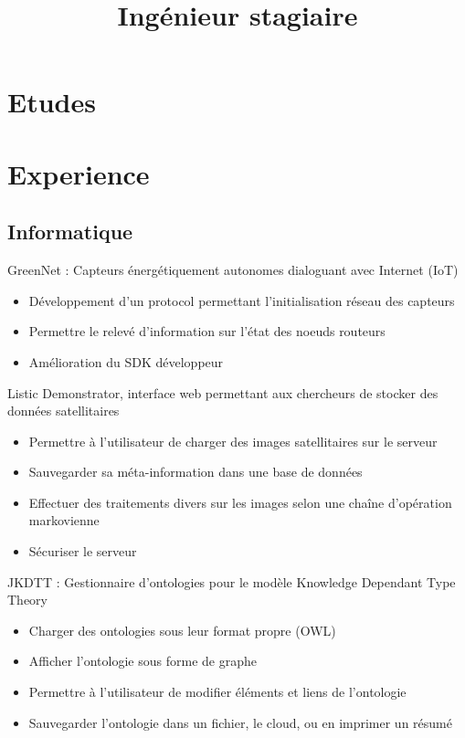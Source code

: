 \documentclass[10pt,a4paper,sans]{moderncv}        %
\title{Ingénieur stagiaire}                               %
\begin{document}
\makecvtitle

\section{Etudes}

\section{Experience}
\subsection{Informatique}
	{GreenNet : Capteurs énergétiquement autonomes dialoguant avec Internet
		(IoT)
	\begin{itemize}
		\item Développement d'un protocol permettant l'initialisation réseau des
			capteurs
		\item Permettre le relevé d'information sur l'état des noeuds routeurs
		\item Amélioration du SDK développeur
	\end{itemize}
	}
	{Listic Demonstrator, interface web permettant aux chercheurs de stocker des
	données satellitaires
	\begin{itemize}
		\item Permettre à l'utilisateur de charger des images satellitaires sur
			le serveur
		\item Sauvegarder sa méta-information dans une base de données
		\item Effectuer des traitements divers sur les images selon une chaîne
			d'opération markovienne
		\item Sécuriser le serveur
	\end{itemize}
	}
	{JKDTT : Gestionnaire d'ontologies pour le modèle Knowledge Dependant Type
		Theory
	\begin{itemize}
		\item Charger des ontologies sous leur format propre (OWL)
		\item Afficher l'ontologie sous forme de graphe
		\item Permettre à l'utilisateur de modifier éléments et liens de
			l'ontologie
		\item Sauvegarder l'ontologie dans un fichier, le cloud, ou en imprimer
			un résumé
	\end{itemize}
	}
\end{document}
